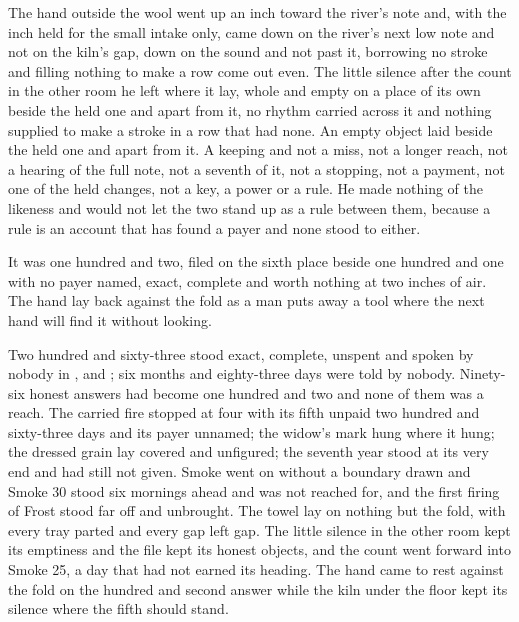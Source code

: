 The hand outside the wool went up an inch toward the river's note and, with the inch held for the small intake only, came down on the river's next low note and not on the kiln's gap, down on the sound and not past it, borrowing no stroke and filling nothing to make a row come out even. The little silence after the count in the other room he left where it lay, whole and empty on a place of its own beside the held one and apart from it, no rhythm carried across it and nothing supplied to make a stroke in a row that had none. An empty object laid beside the held one and apart from it. A keeping and not a miss, not a longer reach, not a hearing of the full note, not a seventh of it, not a stopping, not a payment, not one of the held changes, not a key, a power or a rule. He made nothing of the likeness and would not let the two stand up as a rule between them, because a rule is an account that has found a payer and none stood to either.

It was one hundred and two, filed on the sixth place beside one hundred and one with no payer named, exact, complete and worth nothing at two inches of air. The hand lay back against the fold as a man puts away a tool where the next hand will find it without looking.

Two hundred and sixty-three stood exact, complete, unspent and spoken by nobody in ,  and ; six months and eighty-three days were told by nobody. Ninety-six honest answers had become one hundred and two and none of them was a reach. The carried fire stopped at four with its fifth unpaid two hundred and sixty-three days and its payer unnamed; the widow's mark hung where it hung; the dressed grain lay covered and unfigured; the seventh year stood at its very end and had still not given. Smoke went on without a boundary drawn and Smoke 30 stood six mornings ahead and was not reached for, and the first firing of Frost stood far off and unbrought. The towel lay on nothing but the fold, with every tray parted and every gap left gap. The little silence in the other room kept its emptiness and the file kept its honest objects, and the count went forward into Smoke 25, a day that had not earned its heading. The hand came to rest against the fold on the hundred and second answer while the kiln under the floor kept its silence where the fifth should stand.
